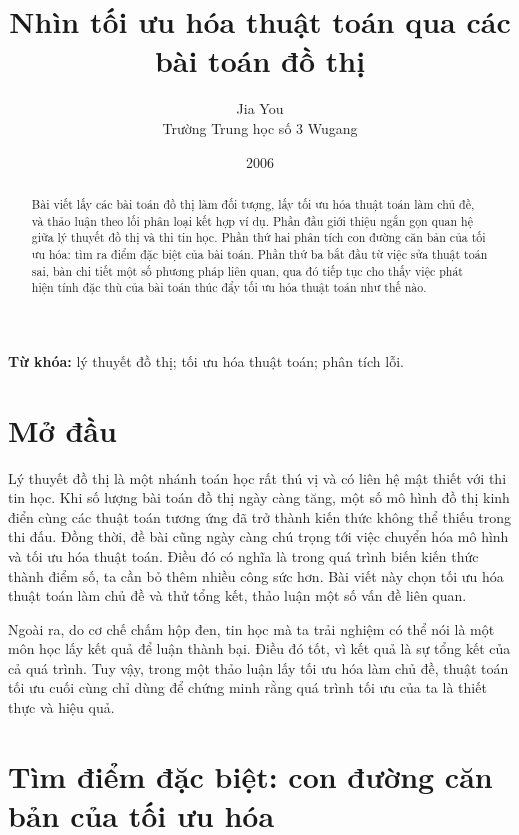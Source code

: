 \documentclass[11pt]{article}
\title{Nhìn tối ưu hóa thuật toán qua các bài toán đồ thị}
\author{Jia You\\Trường Trung học số 3 Wugang}
\date{2006}
\begin{document}
\maketitle


\renewcommand{\abstractname}{Tóm tắt}
\begin{abstract}
Bài viết lấy các bài toán đồ thị làm đối tượng, lấy tối ưu hóa thuật toán làm
chủ đề, và thảo luận theo lối phân loại kết hợp ví dụ. Phần đầu giới thiệu
ngắn gọn quan hệ giữa lý thuyết đồ thị và thi tin học. Phần thứ hai phân tích
con đường căn bản của tối ưu hóa: tìm ra điểm đặc biệt của bài toán. Phần thứ
ba bắt đầu từ việc sửa thuật toán sai, bàn chi tiết một số phương pháp liên
quan, qua đó tiếp tục cho thấy việc phát hiện tính đặc thù của bài toán thúc
đẩy tối ưu hóa thuật toán như thế nào.
\end{abstract}

\noindent\textbf{Từ khóa:} lý thuyết đồ thị; tối ưu hóa thuật toán; phân tích
lỗi.

\section{Mở đầu}

Lý thuyết đồ thị là một nhánh toán học rất thú vị và có liên hệ mật thiết với
thi tin học. Khi số lượng bài toán đồ thị ngày càng tăng, một số mô hình đồ
thị kinh điển cùng các thuật toán tương ứng đã trở thành kiến thức không thể
thiếu trong thi đấu. Đồng thời, đề bài cũng ngày càng chú trọng tới việc
chuyển hóa mô hình và tối ưu hóa thuật toán. Điều đó có nghĩa là trong quá
trình biến kiến thức thành điểm số, ta cần bỏ thêm nhiều công sức hơn. Bài
viết này chọn tối ưu hóa thuật toán làm chủ đề và thử tổng kết, thảo luận một
số vấn đề liên quan.

Ngoài ra, do cơ chế chấm hộp đen, tin học mà ta trải nghiệm có thể nói là một
môn học lấy kết quả để luận thành bại. Điều đó tốt, vì kết quả là sự tổng kết
của cả quá trình. Tuy vậy, trong một thảo luận lấy tối ưu hóa làm chủ đề, thuật
toán tối ưu cuối cùng chỉ dùng để chứng minh rằng quá trình tối ưu của ta là
thiết thực và hiệu quả.

\section{Tìm điểm đặc biệt: con đường căn bản của tối ưu hóa}
\end{document}
